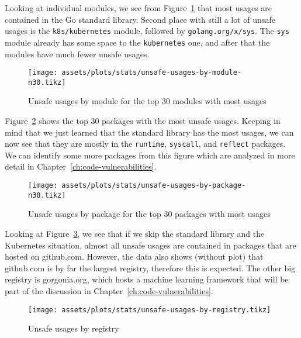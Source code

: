Looking at individual modules, we see from Figure~\ref{fig:unsafe-usages-by-module-n30} that most usages are contained
in the Go standard library.
Second place with still a lot of unsafe usages is the \texttt{k8s/kubernetes} module, followed by
\texttt{golang.org/x/sys}.
The \texttt{sys} module already has some space to the \texttt{kubernetes} one, and after that the modules have much
fewer unsafe usages.

\begin{figure}[ht]
    \centering
    {\scriptsize \texttt{[image: assets/plots/stats/unsafe-usages-by-module-n30.tikz]}}
    \caption{Unsafe usages by module for the top 30 modules with most usages}
    \label{fig:unsafe-usages-by-module-n30}
\end{figure}

Figure~\ref{fig:unsafe-usages-by-package-n30} shows the top 30 packages with the most unsafe usages.
Keeping in mind that we just learned that the standard library has the most usages, we can now see that they are mostly
in the \texttt{runtime}, \texttt{syscall}, and \texttt{reflect} packages.
We can identify some more packages from this figure which are analyzed in more detail in Chapter~\ref{ch:code-vulnerabilities}.

\begin{figure}[ht]
    \centering
    {\scriptsize \texttt{[image: assets/plots/stats/unsafe-usages-by-package-n30.tikz]}}
    \caption{Unsafe usages by package for the top 30 packages with most usages}
    \label{fig:unsafe-usages-by-package-n30}
\end{figure}

Looking at Figure~\ref{fig:unsafe-usages-by-registry}, we see that if we skip the standard library and the Kubernetes
situation, almost all unsafe usages are contained in packages that are hosted on github.com.
However, the data also shows (without plot) that github.com is by far the largest registry, therefore this is expected.
The other big registry is gorgonia.org, which hosts a machine learning framework that will be part of the discussion in
Chapter~\ref{ch:code-vulnerabilities}.

\begin{figure}[ht]
    \centering
    {\scriptsize \texttt{[image: assets/plots/stats/unsafe-usages-by-registry.tikz]}}
    \caption{Unsafe usages by registry}
    \label{fig:unsafe-usages-by-registry}
\end{figure}

